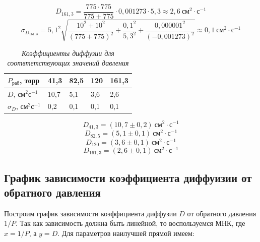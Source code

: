 \documentclass[a4paper,12pt]{article}
\begin{document}
\begin{equation*}
    D_{161,3} = \frac{775 \cdot 775}{775 + 775} \cdot 0,001273 \cdot 5,3 \approx 2,6 \ \text{см}^2 \cdot \text{с}^{-1}
\end{equation*}
\begin{equation*}
    \sigma_{D_{161,3}} = {5,1}^2 \sqrt{
    \frac{10^2 + 10^2}{\left( 775 + 775 \right)^2} + 
    \frac{{0,1}^2}{{5,3}^2} + \frac{{0,000001}^2}{({-0,001273})^2}
    } \approx 0,1 \ \text{см}^2 \cdot \text{с}^{-1}
\end{equation*}

\begin{table}[!ht]
    \centering
    \begin{tabular}{|l|l|l|l|l|}
    \hline
        $P_\text{раб}$, торр & 41,3 & 82,5 & 120 & 161,3 \\ \hline
        $D$, $\text{см}^2 \text{с}^{-1}$ & 10,7 & 5,1 & 3,6 & 2,6 \\ \hline
        $\sigma_D$, $\text{см}^2 \text{с}^{-1}$ & 0,2 & 0,1 & 0,1 & 0,1 \\ \hline
    \end{tabular}\caption{\textit{Коэффициенты диффузии для соотвтетствующих значений давления}}\label{table:diffusion}
\end{table}

\begin{equation*}
    D_{41,3} = (10,7 \pm 0,2) \ \text{см}^2 \cdot \text{с}^{-1}
\end{equation*}
\begin{equation*}
    D_{82,5} = (5,1 \pm 0,1) \ \text{см}^2 \cdot \text{с}^{-1}
\end{equation*}
\begin{equation*}
    D_{120} = (3,6 \pm 0,1) \ \text{см}^2 \cdot \text{с}^{-1}
\end{equation*}
\begin{equation*}
    D_{161,3} = (2,6 \pm 0,1) \ \text{см}^2 \cdot \text{с}^{-1}
\end{equation*}
 
\subsection{График зависимости коэффициента диффуизии от обратного давления}

Построим график зависимости коэффициента диффузии $D$ от обратного давления $1/P$. Так как зависимость должна быть линейной, то воспользуемся МНК, где $x = 1/P$, а $y = D$. Для параметров наилучшей прямой имеем:
\end{document}
